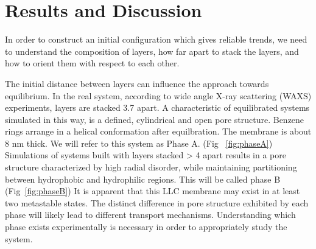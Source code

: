 \section{Results and Discussion}

In order to construct an initial configuration which gives reliable 
trends, we need to understand the composition of layers, how far apart
to stack the layers, and how to orient them with respect to each other.

The initial distance between layers can influence the approach towards
equilibrium. In the real system, according to wide angle X-ray
scattering (WAXS) experiments, layers are stacked 3.7 \angstrom apart.
A characteristic of equilibrated systems simulated in this way, is a
defined, cylindrical and open pore structure. Benzene rings arrange in
a helical conformation after equilbration. The membrane is about 8 nm
thick. We will refer to this system as Phase A. (Fig ~\ref{fig:phaseA})
Simulations of systems built with layers stacked > 4 \angstrom apart
results in a pore structure characterized by high radial disorder,
while maintaining partitioning between hydrophobic and hydrophilic
regions. This will be called phase B (Fig~\ref{fig:phaseB})
It is apparent that this LLC membrane may exist in at least two
metastable states. The distinct difference in pore structure exhibited
by each phase will likely lead to different transport mechanisms.
Understanding which phase exists experimentally is necessary in order
to appropriately study the system.



